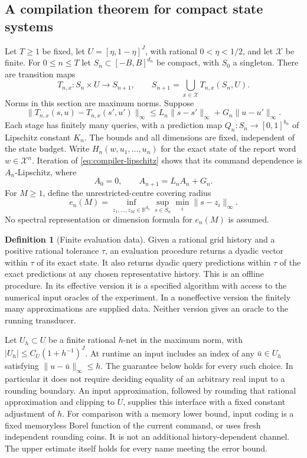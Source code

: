 \documentclass[11pt]{amsart}
\theoremstyle{definition}\newtheorem{definition}[theorem]{Definition}
\theoremstyle{remark}\newtheorem{remark}[theorem]{Remark}
\begin{document}
\subsection{A compilation theorem for compact state systems}
Let $T\ge1$ be fixed, let $U=[\eta,1-\eta]^J$, with rational
$0<\eta<1/2$, and let $\mathcal X$ be finite. For $0\le n\le T$
let $S_n\subset[-B,B]^{d_n}$ be compact, with $S_0$ a singleton.
There are transition maps
\[
 T_{n,x}:S_n\times U\longrightarrow S_{n+1},\qquad
 S_{n+1}=\bigcup_{x\in\mathcal X}T_{n,x}(S_n,U).
\]
Norms in this section are maximum norms. Suppose
\begin{equation}\label{eq:compiler-lipschitz}
 \|T_{n,x}(s,u)-T_{n,x}(s',u')\|_\infty
 \le L_n\|s-s'\|_\infty+G_n\|u-u'\|_\infty.
\end{equation}
Each stage has finitely many queries, with a prediction map
$Q_n:S_n\to[0,1]^{b_n}$ of Lipschitz constant $K_n$.
The bounds and all dimensions are fixed, independent of the state budget.
Write $H_n(w,u_1,\ldots,u_n)$ for the exact state of the report word
$w\in\mathcal X^n$. Iteration of \eqref{eq:compiler-lipschitz} shows that
its command dependence is $A_n$-Lipschitz, where
\[
 A_0=0,\qquad A_{n+1}=L_nA_n+G_n.
\]
For $M\ge1$, define the unrestricted-centre covering radius
\[
 e_n(M)=\inf_{z_1,\ldots,z_M\in\mathbb R^{d_n}}
                  \sup_{s\in S_n}\min_i\|s-z_i\|_\infty.
\]
No spectral representation or dimension formula for $e_n(M)$ is assumed.

\begin{definition}[Finite evaluation data]\label{def:finite-data}
Given a rational grid history and a positive rational tolerance $\tau$,
an evaluation procedure returns a dyadic vector within $\tau$ of its
exact state. It also returns dyadic query predictions within $\tau$ of
the exact predictions at any chosen representative history. This is an
offline procedure. In its effective version it is a specified algorithm
with access to the numerical input oracles of the experiment. In a
noneffective version the finitely many approximations are supplied data.
Neither version gives an oracle to the running transducer.
\end{definition}

Let $U_h\subset U$ be a finite rational $h$-net in the maximum norm,
with $|U_h|\le C_U(1+h^{-1})^J$. At runtime an input includes an index
of any $\bar u\in U_h$ satisfying $\|u-\bar u\|_\infty\le h$.
The guarantee below holds for every such choice. In particular it does
not require deciding equality of an arbitrary real input to a rounding
boundary. An input approximation, followed by rounding that rational
approximation and clipping to $U$, supplies this interface with a fixed
constant adjustment of $h$. For comparison with a memory lower bound,
input coding is a fixed memoryless Borel function of the current command,
or uses fresh independent rounding coins. It is not an additional
history-dependent channel. The upper estimate itself holds for every
name meeting the error bound.
\end{document}
